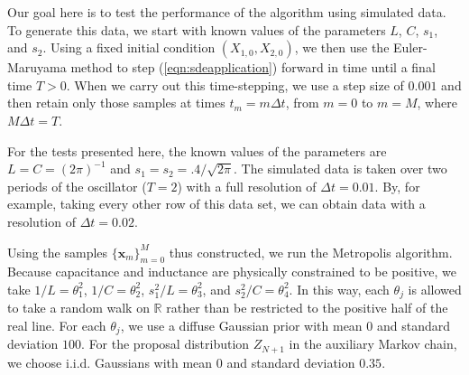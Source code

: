 \documentclass[graybox]{svmult}
\begin{document}
Our goal here is to test the performance of the algorithm using simulated data.  To generate this data, we start with known values of the parameters $L$, $C$, $s_1$, and $s_2$.  Using a fixed initial condition $(X_{1,0},X_{2,0})$, we then use the Euler-Maruyama method to step (\ref{eqn:sdeapplication}) forward in time until a final time $T > 0$.  When we carry out this time-stepping, we use a step size of $0.001$ and then retain only those samples at times $t_m = m \Delta t$, from $m = 0$ to $m = M$, where $M \Delta t = T$.

For the tests presented here, the known values of the parameters are $L = C = (2 \pi)^{-1}$ and $s_1 =  s_2 = .4/\sqrt{2 \pi}$.  The simulated data is taken over two periods of the oscillator ($T = 2$) with a full resolution of $\Delta t = 0.01$.  By, for example, taking every other row of this data set, we can obtain data with a resolution of $\Delta t = 0.02$.

Using the samples $\{ \mathbf{x}_m \}_{m=0}^M$ thus constructed, we run the Metropolis algorithm. 
Because capacitance and inductance are physically constrained to be positive, we take $1/L = \theta_1^2$, $1/C = \theta_2^2$, $s_1^2/L = \theta_3^2$, and $s_2^2/C = \theta_4^2$.  In this way, each $\theta_j$ is allowed to take a random walk on $\mathbb{R}$ rather than be restricted to the positive half of the real line.  For each $\theta_j$, we use a diffuse Gaussian prior with mean $0$ and standard deviation $100$.  For the proposal distribution $Z_{N+1}$ in the auxiliary Markov chain, we choose i.i.d. Gaussians with mean $0$ and standard deviation $0.35$.
\end{document}
